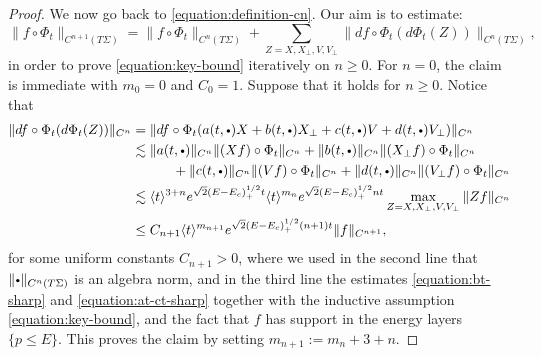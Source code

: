 \documentclass[JEP,XML,SOM,Unicode,published]{cedram}
\newcommand{\sbullet}{{\scriptscriptstyle\bullet}}
\newcommand{\csbullet}{{\raisebox{1pt}{$\sbullet$}}}
\theoremstyle{plain}
\theoremstyle{definition}
\begin{document}
\begin{proof}
We now go back to \eqref{equation:definition-cn}. Our aim is to estimate:
\[
\|f\circ\Phi_t\|_{C^{n+1}(T\Sigma)} = \|f\circ\Phi_t\|_{C^n(T\Sigma)} + \sum_{Z = X,X_\perp,V,V_\perp} \|df \circ \Phi_t (d\Phi_t(Z))\|_{C^n(T\Sigma)},
\]
in order to prove \eqref{equation:key-bound} iteratively on $n \geq 0$. For $n = 0$, the claim is immediate with $m_0 = 0$ and $C_0 = 1$. Suppose that it holds for $n \geq 0$. Notice that
\[
\begin{split}
\|df \circ \Phi_t (d\Phi_t(Z))\|_{C^n} & = \|df \circ \Phi_t (a(t,\csbullet) X + b(t,\csbullet) X_\perp + c(t,\csbullet) V + d(t,\csbullet) V_\perp)\|_{C^n} \\
& \lesssim \|a(t,\csbullet)\|_{C^n} \|(Xf)\circ\Phi_t\|_{C^n} + \|b(t,\csbullet)\|_{C^n} \|(X_\perp f)\circ\Phi_t\|_{C^n} \\
& \hspace*{1.05cm} + \|c(t,\csbullet)\|_{C^n} \|(Vf)\circ\Phi_t\|_{C^n} + \|d(t,\csbullet)\|_{C^n} \|(V_\perp f)\circ\Phi_t\|_{C^n} \\
& \lesssim \langle t \rangle^{3+n} e^{\sqrt{2}(E-E_c)_+^{1/2}t} \langle t \rangle^{m_n} e^{\sqrt{2}(E-E_c)_+^{1/2}nt} \max_{Z=X,X_\perp,V,V_\perp}\|Z f\|_{C^n} \\
& \leq C_{n+1}\langle t \rangle^{m_{n+1}} e^{\sqrt{2}(E-E_c)_+^{1/2}(n+1)t} \|f\|_{C^{n+1}},
\end{split}
\]
for some uniform constants $C_{n+1} > 0$, where we used in the second line that $\|\csbullet\|_{C^n(T\Sigma)}$ is an algebra norm, and in the third line the estimates \eqref{equation:bt-sharp} and \eqref{equation:at-ct-sharp} together with the inductive assumption \eqref{equation:key-bound}, and the fact that $f$ has support in the energy layers $\{p \leq E\}$. This proves the claim by setting $m_{n+1} := m_n + 3 + n$.
\end{proof}
\end{document}

